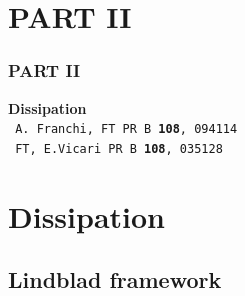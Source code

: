 \section{PART II}

\begin{frame}
	\frametitle{\Large{\rm PART II}}

\begin{center}
	{\LARGE{ \bf Dissipation}\\}
	\medskip
	\medskip
	\medskip
	\texttt{ \Large
  A. Franchi, FT PR B {\bf 108}, 094114 }\\
        \texttt{ \Large
  FT, E.Vicari PR B {\bf 108}, 035128 } 
\end{center}
\end{frame}

\section{Dissipation}
	\subsection{Lindblad framework}


